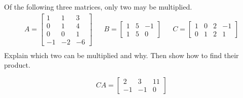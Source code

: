 
\begin{exerciseStatement}


Of the following three matrices, only two may be multiplied. 
\begin{align*} A= \left[\begin{array}{ccc}
1 & 1 & 3 \\
0 & 1 & 4 \\
0 & 0 & 1 \\
-1 & -2 & -6
\end{array}\right]  & & B= \left[\begin{array}{ccc}
1 & 5 & -1 \\
1 & 5 & 0
\end{array}\right]  & & C= \left[\begin{array}{cccc}
1 & 0 & 2 & -1 \\
0 & 1 & 2 & 1
\end{array}\right]  \\ \end{align*}
             Explain which two can be multiplied and why. Then show how to find their product.


\end{exerciseStatement}
    
\begin{exerciseAnswer} 
\[CA= \left[\begin{array}{ccc}
2 & 3 & 11 \\
-1 & -1 & 0
\end{array}\right] \]
\end{exerciseAnswer}
    
